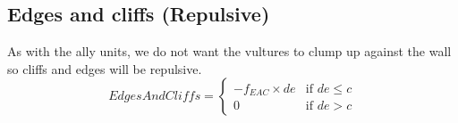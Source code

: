 	\subsection*{Edges and cliffs (Repulsive)}
		As with the ally units, we do not want the vultures to clump up against the wall so cliffs and edges will be repulsive.
		\begin{displaymath}
			EdgesAndCliffs = \begin{cases}
					-f_{EAC} \times {de} & \text{if } de \leq c\\
					0 & \text{if } de > c
				\end{cases}		
		\end{displaymath}
	
	